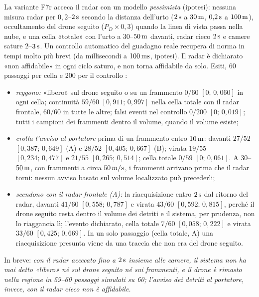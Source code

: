 La variante F7r acceca il radar con un modello \emph{pessimista} (ipotesi): nessuna misura radar per $0{,}2$--$2\,\mathrm{s}$ secondo la distanza dell'urto ($2\,\mathrm{s}$ a $30\,\mathrm{m}$, $0{,}2\,\mathrm{s}$ a $100\,\mathrm{m}$), occultamento del drone seguito ($P_D\times0{,}3$) quando la linea di vista passa nella nube, e una cella «totale» con l'urto a $30$--$50\,\mathrm{m}$ davanti, radar cieco $2\,\mathrm{s}$ e camere sature $2$--$3\,\mathrm{s}$. Un controllo automatico del guadagno reale recupera di norma in tempi molto più brevi (da millisecondi a $100\,\mathrm{ms}$, ipotesi). Il radar è dichiarato «non affidabile» in ogni ciclo saturo, e non torna affidabile da solo. Esiti, 60 passaggi per cella e 200 per il controllo :
\begin{itemize}
\item \emph{reggono:} «libero» sul drone seguito o su un frammento $0/60$ $[0;\,0{,}060]$ in ogni cella; continuità $59/60$ $[0{,}911;\,0{,}997]$ nella cella totale con il radar frontale, $60/60$ in tutte le altre; falsi eventi nel controllo $0/200$ $[0;\,0{,}019]$; tutti i campioni dei frammenti dentro il volume, quando il volume esiste;
\item \emph{crolla l'avviso al portatore} prima di un frammento entro $10\,\mathrm{m}$: davanti $27/52$ $[0{,}387;\,0{,}649]$ (A) e $28/52$ $[0{,}405;\,0{,}667]$ (B); virata $19/55$ $[0{,}234;\,0{,}477]$ e $21/55$ $[0{,}265;\,0{,}514]$; cella totale $0/59$ $[0;\,0{,}061]$. A $30$--$50\,\mathrm{m}$, con frammenti a circa $50\,\mathrm{m/s}$, i frammenti arrivano prima che il radar torni: nessun avviso basato sul volume localizzato può precederli;
\item \emph{scendono con il radar frontale (A):} la riacquisizione entro $2\,\mathrm{s}$ dal ritorno del radar, davanti $41/60$ $[0{,}558;\,0{,}787]$ e virata $43/60$ $[0{,}592;\,0{,}815]$, perché il drone seguito resta dentro il volume dei detriti e il sistema, per prudenza, non lo riaggancia lì; l'evento dichiarato, cella totale $7/60$ $[0{,}058;\,0{,}222]$ e virata $33/60$ $[0{,}425;\,0{,}669]$. In un solo passaggio (cella totale, A) una riacquisizione presunta viene da una traccia che non era del drone seguito.
\end{itemize}
In breve: \emph{con il radar accecato fino a $2\,\mathrm{s}$ insieme alle camere, il sistema non ha mai detto «libero» né sul drone seguito né sui frammenti, e il drone è rimasto nella regione in 59--60 passaggi simulati su 60; l'avviso dei detriti al portatore, invece, con il radar cieco non è affidabile.}


